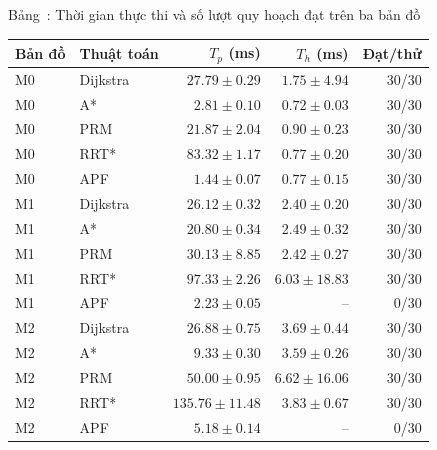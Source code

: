 \documentclass[12pt,a4paper,oneside]{report}
\renewcommand{\tablename}{Bảng}
\begin{document}
\begin{center}
\begin{minipage}{\linewidth}
  \centering
  \singlespacing
  \label{tab:so-sanh-nam-thuat-toan}
  \tablename~\thetable: Thời gian thực thi và số lượt quy hoạch đạt trên ba bản đồ\par\smallskip
  \small
  \renewcommand{\arraystretch}{1.16}
  \begin{tabular}{@{}llrrr@{}}
    \toprule
    \textbf{Bản đồ} & \textbf{Thuật toán} & \(T_p\) \textbf{(ms)} & \(T_h\) \textbf{(ms)} & \textbf{Đạt/thử}\\
    \midrule
    M0 & Dijkstra & \(27.79\pm0.29\) & \(1.75\pm4.94\) & 30/30\\
    M0 & A* & \(2.81\pm0.10\) & \(0.72\pm0.03\) & 30/30\\
    M0 & PRM & \(21.87\pm2.04\) & \(0.90\pm0.23\) & 30/30\\
    M0 & RRT* & \(83.32\pm1.17\) & \(0.77\pm0.20\) & 30/30\\
    M0 & APF & \(1.44\pm0.07\) & \(0.77\pm0.15\) & 30/30\\
    \midrule
    M1 & Dijkstra & \(26.12\pm0.32\) & \(2.40\pm0.20\) & 30/30\\
    M1 & A* & \(20.80\pm0.34\) & \(2.49\pm0.32\) & 30/30\\
    M1 & PRM & \(30.13\pm8.85\) & \(2.42\pm0.27\) & 30/30\\
    M1 & RRT* & \(97.33\pm2.26\) & \(6.03\pm18.83\) & 30/30\\
    M1 & APF & \(2.23\pm0.05\) & -- & 0/30\\
    \midrule
    M2 & Dijkstra & \(26.88\pm0.75\) & \(3.69\pm0.44\) & 30/30\\
    M2 & A* & \(9.33\pm0.30\) & \(3.59\pm0.26\) & 30/30\\
    M2 & PRM & \(50.00\pm0.95\) & \(6.62\pm16.06\) & 30/30\\
    M2 & RRT* & \(135.76\pm11.48\) & \(3.83\pm0.67\) & 30/30\\
    M2 & APF & \(5.18\pm0.14\) & -- & 0/30\\
    \bottomrule
  \end{tabular}
  \par\smallskip
\end{minipage}
\end{center}
\end{document}
